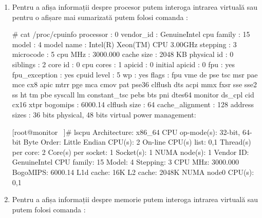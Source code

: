 \begin{enumerate}
	\item Pentru a afișa informații despre procesor putem interoga intrarea
		virtuală  sau pentru o afișare mai sumarizată putem
		folosi comanda :

\begin{screen}
# cat /proc/cpuinfo
processor       : 0
vendor_id       : GenuineIntel
cpu family      : 15
model           : 4
model name      : Intel(R) Xeon(TM) CPU 3.00GHz
stepping        : 3
microcode       : 5
cpu MHz         : 3000.000
cache size      : 2048 KB
physical id     : 0
siblings        : 2
core id         : 0
cpu cores       : 1
apicid          : 0
initial apicid  : 0
fpu             : yes
fpu_exception   : yes
cpuid level     : 5
wp              : yes
flags           : fpu vme de pse tsc msr pae mce cx8 apic mtrr pge mca cmov pat pse36 clflush dts acpi mmx fxsr sse sse2 ss ht tm pbe syscall lm constant_tsc pebs bts pni dtes64 monitor ds_cpl cid cx16 xtpr
bogomips        : 6000.14
clflush size    : 64
cache_alignment : 128
address sizes   : 36 bits physical, 48 bits virtual
power management:


[root@monitor ~]# lscpu
Architecture:          x86_64
CPU op-mode(s):        32-bit, 64-bit
Byte Order:            Little Endian
CPU(s):                2
On-line CPU(s) list:   0,1
Thread(s) per core:    2
Core(s) per socket:    1
Socket(s):             1
NUMA node(s):          1
Vendor ID:             GenuineIntel
CPU family:            15
Model:                 4
Stepping:              3
CPU MHz:               3000.000
BogoMIPS:              6000.14
L1d cache:             16K
L2 cache:              2048K
NUMA node0 CPU(s):     0,1
\end{screen}


	\item Pentru a afișa informații despre memorie putem interoga intrarea
		virtuală  sau putem folosi comanda
		:


\end{enumerate}
